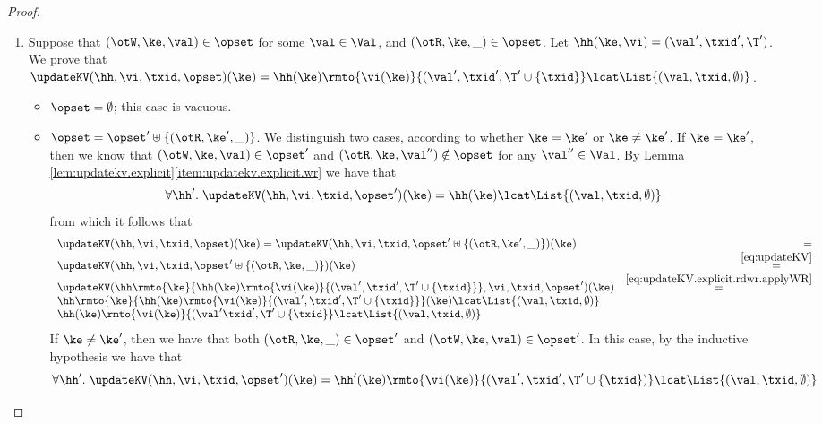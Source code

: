 \begin{proof}
\begin{enumerate}
		\item Suppose that $(\otW, \ke, \val) \in \opset$ for some $\val \in \Val$, and $(\otR, \ke, \_) \in \opset$. 
		Let $\hh(\ke, \vi) = (\val', \txid', \T')$. We prove that $\updateKV(\hh, \vi, \txid, \opset)(\ke) = 
		\hh(\ke)\rmto{\vi(\ke)}{(\val', \txid', \T' \cup \{\txid\}} \lcat \List{(\val, \txid, \emptyset)}$. 
			\begin{itemize}
			\item $\opset = \emptyset$; this case is vacuous.
			\item $\opset = \opset' \uplus \{(\otR, \ke', \_)\}$. We distinguish two cases, according to 
			whether $\ke = \ke'$ or $\ke \neq \ke'$. If $\ke = \ke'$, then we know that 
			$(\otW, \ke, \val) \in \opset'$ and $(\otR, \ke, \val'') \notin \opset$ for any $\val'' \in \Val$. 
			By Lemma \cref{lem:updatekv.explicit}\eqref{item:updatekv.explicit.wr} we have that 
			\begin{equation}
			\forall \hh'.\;\updateKV(\hh,\vi,\txid,\opset')(\ke) = \hh(\ke) \lcat \List{(\val, \txid, \emptyset)}
			\label{eq:updateKV.explicit.rdwr.applyWR}
			\end{equation}
			from which it follows that 
			\[
			\begin{array}{lr}
			\updateKV(\hh, \vi, \txid, \opset)(\ke) = \updateKV(\hh, \vi, \txid, \opset' \uplus \{(\otR, \ke', \_)\})(\ke) &=\\
			\updateKV(\hh, \vi, \txid, \opset' \uplus \{(\otR, \ke, \_)\})(\ke) &\stackrel{\eqref{eq:updateKV}}{=}\\
			\updateKV(\hh\rmto{\ke}{\hh(\ke)\rmto{\vi(\ke)}{(\val', \txid', \T' \cup \{\txid\}}}, \vi, \txid, \opset')(\ke) &\stackrel{\eqref{eq:updateKV.explicit.rdwr.applyWR}}{=}\\
			\hh\rmto{\ke}{\hh(\ke)\rmto{\vi(\ke)}{(\val', \txid', \T' \cup \{\txid\}}}(\ke) \lcat \List{(\val, \txid, \emptyset)}\\
			\hh(\ke)\rmto{\vi(\ke)}{(\val' \txid', \T' \cup \{\txid\}} \lcat \List{(\val, \txid, \emptyset)}
			\end{array}
			\]
			If $\ke \neq \ke'$, then we have that both $(\otR, \ke, \_) \in \opset'$ and 
			$(\otW, \ke, \val) \in \opset'$. In this case, by the inductive hypothesis we have that 
			\begin{equation}
			\forall \hh'.\;\updateKV(\hh,\vi,\txid,\opset')(\ke) = \hh'(\ke)\rmto{\vi(\ke)}{(\val', \txid', \T' \cup \{\txid\})} \lcat \List{(\val, \txid, \emptyset)}
			\label{eq:updatekv.explicit.rdwr.IHrd}
			\end{equation}

\end{itemize}
\end{enumerate}
\end{proof}

